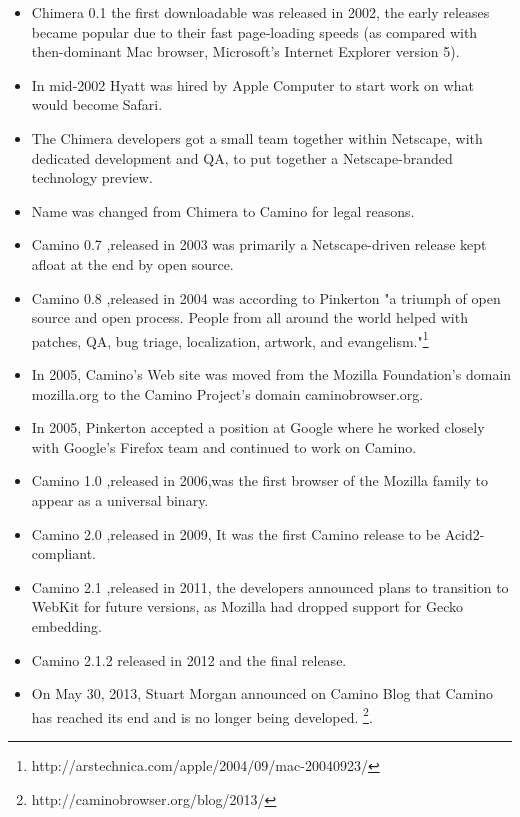 \documentclass[11pt]{article} %
\begin{document}
  \begin{itemize}
  
 \item Chimera 0.1 the first downloadable  was released in 2002, the early releases became popular due to their fast page-loading speeds (as compared with then-dominant Mac browser, Microsoft's Internet Explorer version 5).
 \item In mid-2002 Hyatt was hired by Apple Computer to start work on what would become Safari. 
 \item The Chimera developers got a small team together within Netscape, with dedicated development and QA, to put together a Netscape-branded technology preview.
 \item Name was changed from Chimera to Camino for legal reasons.
 \item Camino 0.7 ,released in 2003 was primarily a Netscape-driven release kept afloat at the end by open source.
  \item Camino 0.8 ,released in 2004 was according to Pinkerton "a triumph of open source and open process. People from all around the world helped with patches, QA, bug triage, localization, artwork, and evangelism."\footnote{http://arstechnica.com/apple/2004/09/mac-20040923/}\\  
 \item In 2005, Camino's Web site was moved from the Mozilla Foundation's domain mozilla.org to the Camino Project's domain caminobrowser.org.
 \item In 2005, Pinkerton accepted a position at Google where he worked closely with Google's Firefox team and continued to work on Camino.
 \item Camino 1.0 ,released in 2006,was the first browser of the Mozilla family to appear as a universal binary.
 \item Camino 2.0 ,released in  2009, It was the first Camino release to be Acid2-compliant.
 \item Camino 2.1 ,released in 2011, the developers announced plans to transition to WebKit for future versions, as Mozilla had dropped support for Gecko embedding.
 \item Camino 2.1.2 released in  2012 and the final release.
\item On May 30, 2013, Stuart Morgan announced on Camino Blog that Camino has reached its end and is no longer being developed. \footnote{http://caminobrowser.org/blog/2013/}.  
 \end{itemize}

\end{document}
